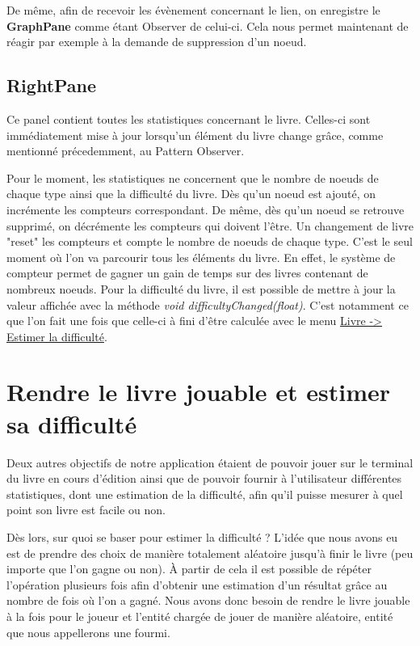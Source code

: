 				De même, afin de recevoir les évènement concernant le lien, on enregistre le \textbf{GraphPane} comme étant Observer de celui-ci. Cela nous permet maintenant de réagir par exemple à la demande de suppression d'un noeud.

		\subsection{RightPane}

			Ce panel contient toutes les statistiques concernant le livre. Celles-ci sont immédiatement mise à jour lorsqu'un élément du livre change grâce, comme mentionné précedemment, au Pattern Observer.

			Pour le moment, les statistiques ne concernent que le nombre de noeuds de chaque type ainsi que la difficulté du livre. Dès qu'un noeud est ajouté, on incrémente les compteurs correspondant. De même, dès qu'un noeud se retrouve supprimé, on décrémente les compteurs qui doivent l'être. Un changement de livre "reset" les compteurs et compte le nombre de noeuds de chaque type. C'est le seul moment où l'on va parcourir tous les éléments du livre. En effet, le système de compteur permet de gagner un gain de temps sur des livres contenant de nombreux noeuds. Pour la difficulté du livre, il est possible de mettre à jour la valeur affichée avec la méthode \textit{void difficultyChanged(float)}. C'est notamment ce que l'on fait une fois que celle-ci à fini d'être calculée avec le menu \underline{Livre -> Estimer la difficulté}.

	\section{Rendre le livre jouable et estimer sa difficulté}
		\label{sec:Jeu}

		Deux autres objectifs de notre application étaient de pouvoir jouer sur le terminal du livre en cours d'édition ainsi que de pouvoir fournir à l'utilisateur différentes statistiques, dont une estimation de la difficulté, afin qu'il puisse mesurer à quel point son livre est facile ou non.

		Dès lors, sur quoi se baser pour estimer la difficulté ? L'idée que nous avons eu est de prendre des choix de manière totalement aléatoire jusqu'à finir le livre (peu importe que l'on gagne ou non). À partir de cela il est possible de répéter l'opération plusieurs fois afin d'obtenir une estimation d'un résultat grâce au nombre de fois où l'on a gagné. Nous avons donc besoin de rendre le livre jouable à la fois pour le joueur et l'entité chargée de jouer de manière aléatoire, entité que nous appellerons une fourmi.

